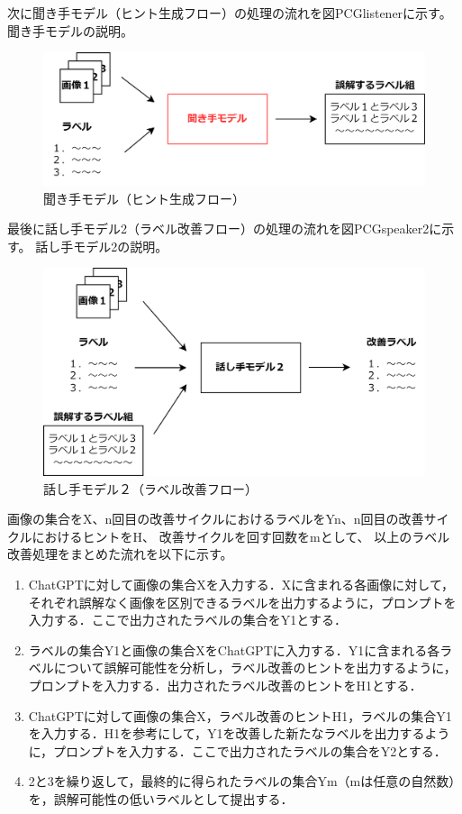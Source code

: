 \documentclass[a4paper,11pt]{jreport}
\begin{document}
次に聞き手モデル（ヒント生成フロー）の処理の流れを図PCGlistenerに示す。
聞き手モデルの説明。

\begin{figure}[H]
	\centering
	\includegraphics[width=0.8\linewidth]{figures/PCGlistener.png}
	\caption{聞き手モデル（ヒント生成フロー）}
	\label{fig:PCGlistener}
\end{figure}


最後に話し手モデル2（ラベル改善フロー）の処理の流れを図PCGspeaker2に示す。
話し手モデル2の説明。

\begin{figure}[H]
	\centering
	\includegraphics[width=0.8\linewidth]{figures/PCGspeaker2.png}
	\caption{話し手モデル２（ラベル改善フロー）}
	\label{fig:PCGspeaker2}
\end{figure}

画像の集合をX、n回目の改善サイクルにおけるラベルをYn、n回目の改善サイクルにおけるヒントをH、
改善サイクルを回す回数をmとして、
以上のラベル改善処理をまとめた流れを以下に示す。

\begin{enumerate}
  \item ChatGPTに対して画像の集合Xを入力する．Xに含まれる各画像に対して，それぞれ誤解なく画像を区別できるラベルを出力するように，プロンプトを入力する．ここで出力されたラベルの集合をY1とする．
  \item ラベルの集合Y1と画像の集合XをChatGPTに入力する．Y1に含まれる各ラベルについて誤解可能性を分析し，ラベル改善のヒントを出力するように，プロンプトを入力する．出力されたラベル改善のヒントをH1とする．
  \item ChatGPTに対して画像の集合X，ラベル改善のヒントH1，ラベルの集合Y1を入力する．H1を参考にして，Y1を改善した新たなラベルを出力するように，プロンプトを入力する．ここで出力されたラベルの集合をY2とする．
  \item 2と3を繰り返して，最終的に得られたラベルの集合Ym（mは任意の自然数）を，誤解可能性の低いラベルとして提出する．
\end{enumerate}
\end{document}
